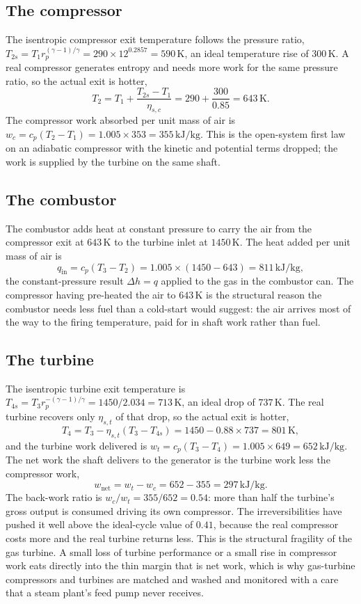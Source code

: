 \subsection{The compressor}

The isentropic compressor exit temperature follows the pressure ratio,
$T_{2s} = T_1 r_p^{(\gamma-1)/\gamma} = 290 \times 12^{0.2857} =
590\,\si{\kelvin}$, an ideal temperature rise of $300\,\si{\kelvin}$. A
real compressor generates entropy and needs more work for the same
pressure ratio, so the actual exit is hotter,
\[
T_2 = T_1 + \frac{T_{2s} - T_1}{\eta_{s,c}}
    = 290 + \frac{300}{0.85} = 643\,\si{\kelvin}.
\]
The compressor work absorbed per unit mass of air is
$w_c = c_p (T_2 - T_1) = 1.005 \times 353 = 355\,\text{kJ}/\text{kg}$.
This is the open-system first law on an adiabatic compressor with the
kinetic and potential terms dropped; the work is supplied by the turbine
on the same shaft.

\subsection{The combustor}

The combustor adds heat at constant pressure to carry the air from the
compressor exit at $643\,\si{\kelvin}$ to the turbine inlet at
$1450\,\si{\kelvin}$. The heat added per unit mass of air is
\[
q_{\text{in}} = c_p (T_3 - T_2) = 1.005 \times (1450 - 643) =
811\,\text{kJ}/\text{kg},
\]
the constant-pressure result $\Delta h = q$ applied to the gas in the
combustor can. The compressor having pre-heated the air to
$643\,\si{\kelvin}$ is the structural reason the combustor needs less
fuel than a cold-start would suggest: the air arrives most of the way to
the firing temperature, paid for in shaft work rather than fuel.

\subsection{The turbine}

The isentropic turbine exit temperature is $T_{4s} = T_3 r_p^{-(\gamma-1)
/\gamma} = 1450/2.034 = 713\,\si{\kelvin}$, an ideal drop of
$737\,\si{\kelvin}$. The real turbine recovers only $\eta_{s,t}$ of that
drop, so the actual exit is hotter,
\[
T_4 = T_3 - \eta_{s,t}(T_3 - T_{4s}) = 1450 - 0.88 \times 737 =
801\,\si{\kelvin},
\]
and the turbine work delivered is $w_t = c_p (T_3 - T_4) = 1.005 \times
649 = 652\,\text{kJ}/\text{kg}$. The net work the shaft delivers to the
generator is the turbine work less the compressor work,
\[
w_{\text{net}} = w_t - w_c = 652 - 355 = 297\,\text{kJ}/\text{kg}.
\]
The back-work ratio is $w_c/w_t = 355/652 = 0.54$: more than half the
turbine's gross output is consumed driving its own compressor. The
irreversibilities have pushed it well above the ideal-cycle value of
$0.41$, because the real compressor costs more and the real turbine
returns less. This is the structural fragility of the gas turbine. A
small loss of turbine performance or a small rise in compressor work
eats directly into the thin margin that is net work, which is why
gas-turbine compressors and turbines are matched and washed and
monitored with a care that a steam plant's feed pump never receives.

